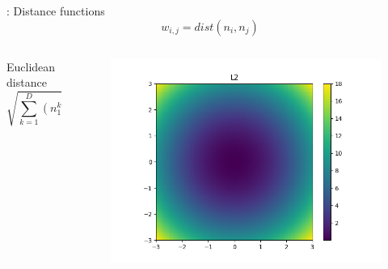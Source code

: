 \begin{frame}{\tciii{} \gene: Distance functions}
    \begin{equation}
    w_{i, j} = dist(n_i, n_j)
    \end{equation}
    
    \begin{columns}
    \begin{column}{0.60\linewidth}
    \begin{block}{Euclidean distance}
    \begin{equation}
    \sqrt{\sum_{k=1}^D \left( n_1^k - n_2^k \right)^2 }
    \end{equation}
    \end{block}
    \end{column}
    
    \begin{column}{0.35\linewidth}
    \begin{figure}
    \centering
    \includegraphics[width=\linewidth]{images/GENE/images/distance_L2.png}
    \end{figure}
    \end{column}
    \end{columns}
    
    
    
\end{frame}


